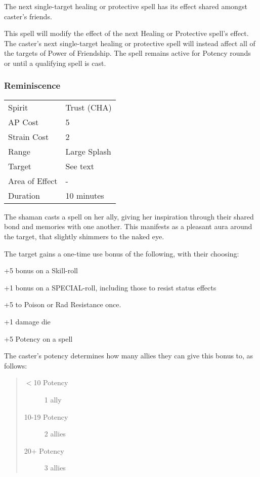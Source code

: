 \documentclass[11pt,a4paper,twocolumn]{book}
\begin{document}
\medskip

The next single-target healing or protective spell has its effect shared amongst caster's friends.

This spell will modify the effect of the next Healing or Protective spell's effect. The caster's next single-target healing or protective spell will instead affect all of the targets of Power of Friendship. The spell remains active for Potency rounds or until a qualifying spell is cast.




\subsubsection*{Reminiscence}
{
	\begin{tabu} to 70mm{| X[l,4] | X[l,7] |}
		\hline
		Spirit         & Trust (CHA)  \\
		AP Cost        & 5            \\
		Strain Cost    & 2            \\
		Range          & Large Splash \\
		Target         & See text     \\
		Area of Effect & -            \\
		Duration       & 10 minutes   \\ \hline
	\end{tabu}
	
}
\medskip

The shaman casts a spell on her ally, giving her inspiration through their shared bond and memories with one another. This manifests as a pleasant aura around the target, that slightly shimmers to the naked eye. 

The target gains a one-time use bonus of the following, with their choosing:
\begin{compactitem}
	\item +5 bonus on a Skill-roll
	\item +1 bonus on a SPECIAL-roll, including those to resist status effects
	\item +5 to Poison or Rad Resistance once.
	\item +1 damage die
	\item +5 Potency on a spell
\end{compactitem}

The caster's potency determines how many allies they can give this bonus to, as follows:
\begin{quote}
	\begin{description}
		\item[$<$10 Potency] 	1 ally
		\item[10-19 Potency] 	2 allies
		\item[20+ Potency] 		3 allies
	\end{description}	
\end{quote}
\end{document}
